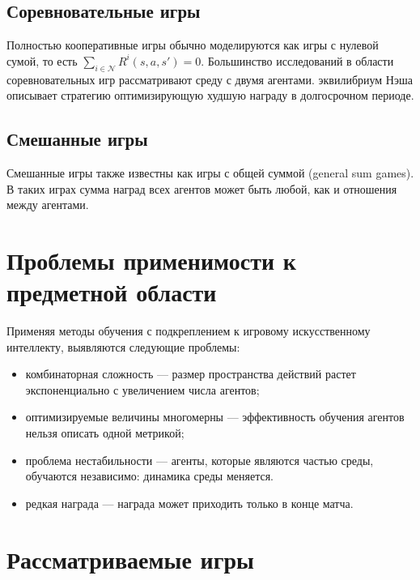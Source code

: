 \subsection{Соревновательные игры}

Полностью кооперативные игры обычно моделируются как игры с нулевой сумой, то есть \( \sum_{i \in \mathcal{N}} R^i(s,a,s') = 0 \).
Большинство исследований в области соревновательных игр рассматривают среду с двумя агентами.
эквилибриум Нэша описывает стратегию оптимизирующую худшую награду в долгосрочном периоде.

\subsection{Смешанные игры}

Смешанные игры также известны как игры с общей суммой (general sum games). В таких играх сумма наград всех агентов может быть любой, как и отношения между агентами.

\section{Проблемы применимости к предметной области}

Применяя методы обучения с подкреплением к игровому искусственному интеллекту, выявляются следующие проблемы:
\begin{itemize}[label=---]
	\item комбинаторная сложность --- размер пространства действий растет экспоненциально с увеличением числа агентов;
	\item оптимизируемые величины многомерны --- эффективность обучения агентов нельзя описать одной метрикой;
	\item проблема нестабильности --- агенты, которые являются частью среды, обучаются независимо: динамика среды меняется.
	\item редкая награда --- награда может приходить только в конце матча.
\end{itemize}

\section{Рассматриваемые игры}


